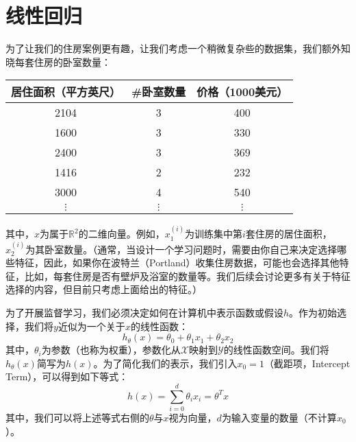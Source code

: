 \chapter{线性回归}

为了让我们的住房案例更有趣，让我们考虑一个稍微复杂些的数据集，我们额外知晓每套住房的卧室数量：

\begin{center}
  \begin{tabular}{c|c|c}
    居住面积（平方英尺） & \#卧室数量 & 价格（1000美元） \\
    \hline
    2104                 & 3          & 400              \\
    1600                 & 3          & 330              \\
    2400                 & 3          & 369              \\
    1416                 & 2          & 232              \\
    3000                 & 4          & 540              \\
    $\vdots$             & $\vdots$   & $\vdots$         \\
  \end{tabular}
\end{center}

其中，$x$为属于$\mathbb{R}^2$的二维向量。例如，$x_1^{(i)}$为训练集中第$i$套住房的居住面积，$x_2^{(i)}$为其卧室数量。（通常，当设计一个学习问题时，需要由你自己来决定选择哪些特征，因此，如果你在波特兰（Portland）收集住房数据，可能也会选择其他特征，比如，每套住房是否有壁炉及浴室的数量等。我们后续会讨论更多有关于特征选择的内容，但目前只考虑上面给出的特征。）

为了开展监督学习，我们必须决定如何在计算机中表示函数或假设$h$。作为初始选择，我们将$y$近似为一个关于$x$的线性函数：
$$
  h_\theta(x)=\theta_0+\theta_1 x_1 + \theta_2 x_2
$$
其中，$\theta_i$为参数（也称为权重），参数化从$\mathscr{X}$映射到$\mathcal{Y}$的线性函数空间。我们将$h_\theta(x)$简写为$h(x)$。为了简化我们的表示，我们引入$x_0=1$（截距项，Intercept Term），可以得到如下等式：
$$
h(x)=\sum^d_{i=0}\theta_i x_i = \theta^T x
$$
其中，我们可以将上述等式右侧的$\theta$与$x$视为向量，$d$为输入变量的数量（不计算$x_0$）。



